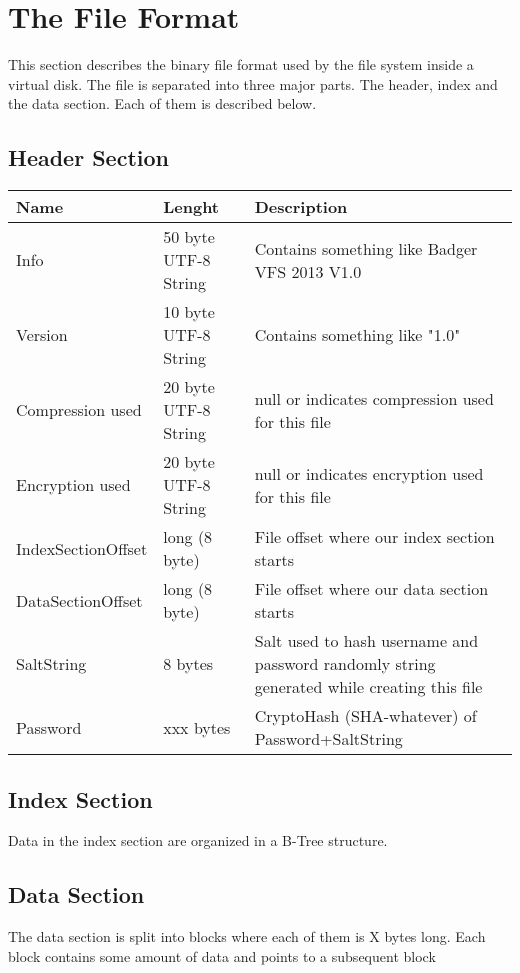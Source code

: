 
\section{The File Format}


This section describes the binary file format used by the file system inside a
virtual disk.
The file is separated into three major parts. The header, index and the data
section. Each of them is described below.

\subsection{Header Section}

\begin{tabular}{|l|l|p{5cm}|}
\hline
  \textbf{Name} & \textbf{Lenght} & \textbf{Description}
\\  \hline
  Info & 50 byte UTF-8 String & Contains something like Badger VFS 2013 V1.0 
\\ \hline
  Version & 10 byte UTF-8 String & Contains something like "1.0"
\\ \hline
  Compression used & 20 byte UTF-8 String & null or indicates compression used for this file
\\ \hline
  Encryption used & 20 byte UTF-8 String & null or indicates encryption used for this file
\\ \hline
 IndexSectionOffset & long (8 byte) &  File offset where our index section
 starts \\ \hline
 DataSectionOffset & long (8 byte) &  File offset where our data section starts
\\ \hline
 SaltString & 8 bytes  & Salt used to hash username and password randomly string generated while creating this
   file
 \\ \hline
  Password & xxx bytes  & CryptoHash (SHA-whatever) of Password+SaltString
\\ \hline

\end{tabular}


\subsection{Index Section}

Data in the index section are organized in a B-Tree structure.


\subsection{Data Section}
The data section is split into blocks where each of them is X bytes long. Each block contains some amount of data and points to a subsequent block


